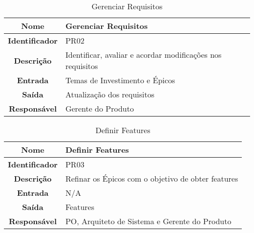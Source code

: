 {            \begin{table}[H]
                \centering
                \caption{Gerenciar Requisitos}
                \begin{tabular}{c|p{10cm}}
                    \hline
                    \textbf{Nome}            & Gerenciar Requisitos\\
                    \hline
                    \textbf{Identificador} & PR02\\
                    \hline
                    \textbf{Descrição}   & Identificar, avaliar e acordar modificações nos requisitos\\
                    \hline
                    \textbf{Entrada}           & Temas de Investimento e Épicos \\
                    \hline
                    \textbf{Saída}            &  Atualização dos requisitos\\
                    \hline
                    \textbf{Responsável}            & Gerente do Produto\\
                    \hline
                \end{tabular}
            \end{table}



              \begin{table}[H]
                \centering
                \caption{Definir Features}
                \begin{tabular}{c|p{10cm}}
                    \hline
                    \textbf{Nome}            & Definir Features\\
                    \hline
                    \textbf{Identificador} & PR03\\
                    \hline
                    \textbf{Descrição}   & Refinar os Épicos com o objetivo de obter features\\
                    \hline
                    \textbf{Entrada}           & N/A\\
                    \hline
                    \textbf{Saída}            &  Features\\
                    \hline
                    \textbf{Responsável}            & PO, Arquiteto de Sistema e Gerente do Produto\\
                    \hline
                \end{tabular}
            \end{table}

}
